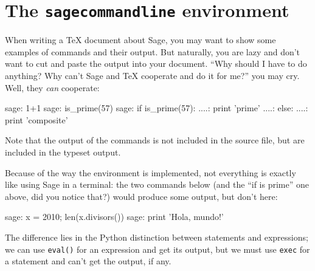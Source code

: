 \documentclass{article}
\begin{document}
\begin{comment}
\begin{sageblock}
  x = lambda t: t
  y(t) = t*sin(1/t)
  gnuplot(x, y, [0.01, 0.02..(0.5)] + [0.55, 0.6..2], 'example-tikz2.table')
\end{sageblock}

\begin{tikzpicture}
 \draw[very thin,->] (-0.25,0) -- (2,0);
 \draw[very thin,->] (0,-1/3) -- (0,1);
 \draw[smooth, red] plot file {example-tikz2.table};
\end{tikzpicture}

This style of plotting will become even more useful and powerful when
the new TikZ Data Visualization library is available---you will be able
to feed TikZ a bunch of data points, and it automatically make a very
nice plot for you, including axes, labels, and so on.

\end{comment}

\section{The \texttt{sagecommandline} environment}

When writing a \TeX{} document about Sage, you may want to show some
examples of commands and their output. But naturally, you are lazy and
don't want to cut and paste the output into your document. ``Why should
I have to do anything? Why can't Sage and \TeX{} cooperate and do it for
me?'' you may cry. Well, they \emph{can} cooperate:

\begin{sagecommandline}
  sage: 1+1
  sage: is_prime(57)
  sage: if is_prime(57):
  ....:     print 'prime'
  ....: else:
  ....:     print 'composite'
\end{sagecommandline}

Note that the output of the commands is not included in the source file,
but are included in the typeset output.

Because of the way the environment is implemented, not everything is
exactly like using Sage in a terminal: the two commands below (and the
``if is prime'' one above, did you notice that?) would produce some
output, but don't here:

\begin{sagecommandline}
  sage: x = 2010; len(x.divisors())
  sage: print 'Hola, mundo!'
\end{sagecommandline}

The difference lies in the Python distinction between statements and
expressions; we can use \texttt{eval()} for an expression and get its
output, but we must use \texttt{exec} for a statement and can't get the
output, if any.
\end{document}
